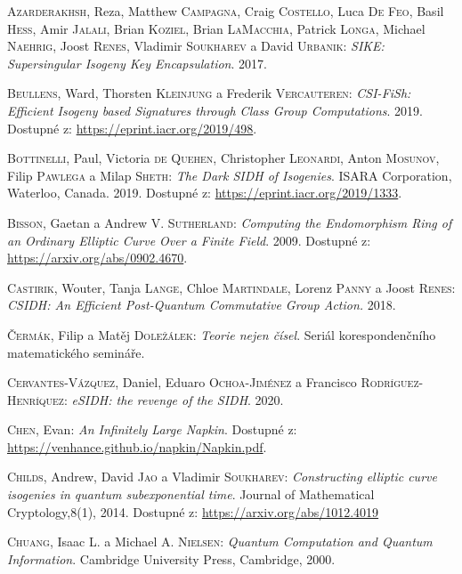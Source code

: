 \documentclass[12pt]{report}
\begin{document}
\begin{thebibliography}{97}

\textsc{Azarderakhsh}, Reza, Matthew \textsc{Campagna}, Craig \textsc{Costello}, Luca \textsc{De Feo}, Basil \textsc{Hess}, Amir \textsc{Jalali}, Brian \textsc{Koziel}, Brian \textsc{LaMacchia}, Patrick \textsc{Longa}, Michael \textsc{Naehrig}, Joost \textsc{Renes}, Vladimir \textsc{Soukharev} a David \textsc{Urbanik}: \textit{SIKE: Supersingular Isogeny Key Encapsulation}. 2017.

\textsc{Beullens}, Ward, Thorsten \textsc{Kleinjung} a Frederik \textsc{Vercauteren}: \textit{CSI-FiSh: Efficient Isogeny based Signatures through Class Group Computations}. 2019. Dostupné z: \url{https://eprint.iacr.org/2019/498}.

\textsc{Bottinelli}, Paul, Victoria \textsc{de Quehen}, Christopher \textsc{Leonardi}, Anton \textsc{Mosunov}, Filip \textsc{Pawlega} a Milap \textsc{Sheth}: \textit{The Dark SIDH of Isogenies}. ISARA Corporation, Waterloo, Canada. 2019. Dostupné z: \url{https://eprint.iacr.org/2019/1333}.


\textsc{Bisson}, Gaetan a Andrew V. \textsc{Sutherland}: \textit{Computing the Endomorphism Ring of an Ordinary Elliptic Curve Over a Finite Field}. 2009. Dostupné z: \url{https://arxiv.org/abs/0902.4670}.

\textsc{Castirik}, Wouter, Tanja \textsc{Lange}, Chloe \textsc{Martindale}, Lorenz \textsc{Panny} a Joost \textsc{Renes}: \textit{CSIDH: An Efficient Post-Quantum Commutative Group Action.} 2018.

\textsc{Čermák}, Filip a Matěj \textsc{Doležálek}: \textit{Teorie nejen čísel}. Seriál korespondenčního matematického semináře.

\textsc{Cervantes-Vázquez}, Daniel, Eduaro \textsc{Ochoa-Jiménez} a Francisco \textsc{Rodríguez-Henríquez}: \textit{eSIDH: the revenge of the SIDH}. 2020.

\textsc{Chen}, Evan: \textit{An Infinitely Large Napkin}. Dostupné z: \url{https://venhance.github.io/napkin/Napkin.pdf}.

\textsc{Childs}, Andrew, David \textsc{Jao} a Vladimir \textsc{Soukharev}: \textit{Constructing elliptic curve isogenies in quantum subexponential time}. Journal of Mathematical Cryptology,8(1), 2014. Dostupné z: \url{https://arxiv.org/abs/1012.4019}

\textsc{Chuang}, Isaac L. a Michael A. \textsc{Nielsen}: \textit{Quantum Computation and Quantum Information}. Cambridge University Press, Cambridge, 2000. 


\end{thebibliography}
\end{document}
